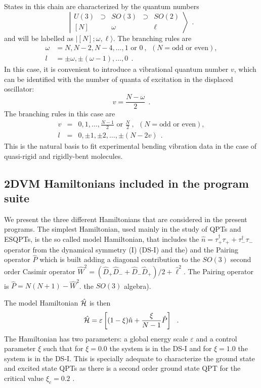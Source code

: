 \documentclass[a4paper,12pt,captions=tableheading]{article}
\begin{document}
States in this chain are
characterized by the quantum numbers 
\begin{equation}
\left|\begin{array}{ccccc}
U(3)&\supset& SO(3)&\supset& SO(2)\\
\left[N\right]   &       & \omega   &       & \ell
\end{array}\right\rangle~~.
\label{anosbas}
\end{equation}
and will be labelled as $|[N];\omega,\ell\rangle$. 
The branching rules are
\begin{align}
\omega & =  N, N-2, N-4, \ldots, 1 \mbox{ or }0 ~,~~ (N = \mbox{odd or
  even}),\nonumber\\
l & =  \pm \omega, \pm (\omega-1) , \ldots , 0~~.
\end{align} 
In this case, it is
convenient to introduce a vibrational 
quantum number \(v\), which can be identified with the number of quanta of
excitation in the displaced oscillator:
\begin{equation}
v=\frac{N-\omega}{2}~~.
\label{vdef}
\end{equation}
The branching rules in this case are
\begin{eqnarray}
v & = & 0,1, \ldots, \frac{N-1}{2} \mbox{ or }\frac{N}{2}~,~~ (N = \mbox{odd or
  even}),\nonumber\\
l & = & 0, \pm 1,\pm 2, \ldots, \pm (N-2v)~~.
\end{eqnarray} 
This is the natural basis to fit experimental bending vibration data
in the case of quasi-rigid and rigidly-bent molecules.

\subsection{2DVM Hamiltonians included in the program suite}
\label{sec-2-3}
We present the three different Hamiltonians that are considered in the
present programs. The simplest Hamiltonian, used mainly in the study
of QPTs and ESQPTs, is the so called model Hamiltonian, that includes
the \(\hat n = \tau^\dagger_+\tau_++\tau^\dagger_-\tau_-\) operator
from the dynamical symmetry (I) (DS-I) and the) and the Pairing
operator \(\hat P\) which is built adding a diagonal contribution to
the \(SO(3)\) second order Casimir operator \(\hat W^2 =(\hat D_+\hat
D_-+\hat D_-\hat D_+)/2+\hat \ell^2\). The Pairing operator is \(\hat
P=N(N+1)-\hat W^2\).  the $SO(3)$ algebra).

The model Hamiltonian \(\hat {\cal H}\) is then
\begin{equation}
\hat {\cal H} = \varepsilon\left[(1-\xi)\hat n + \frac{\xi}{N-1}\hat P\right]~~.
\label{modham1}
\end{equation}
The Hamiltonian has two parameters: a global energy scale
\(\varepsilon\) and a control parameter \(\xi\) such that for \(\xi =
0.0\) the system is in the DS-I and for \(\xi = 1.0\) the system is in
the DS-I. This is specially adequate to characterize the ground state
and excited state QPTs as there is a second order ground state QPT for
the critical value \(\xi_c = 0.2\) \cite{PBernal2008}.
\end{document}
